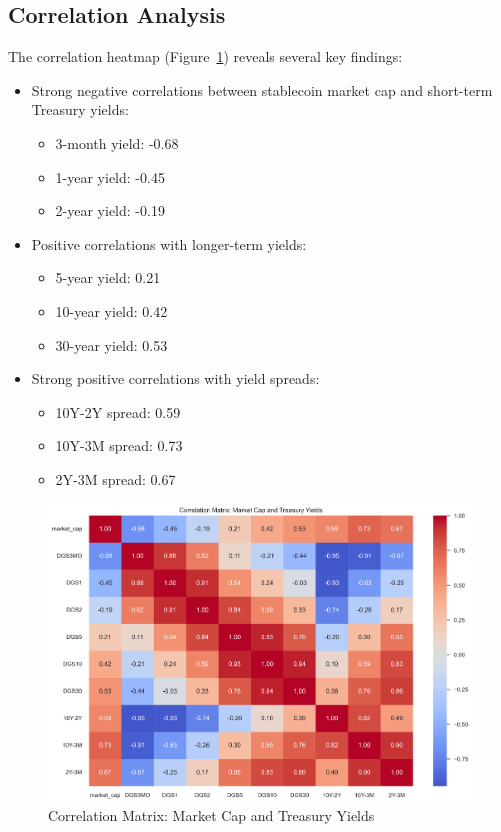 \documentclass[12pt,a4paper]{article}
\begin{document}
\subsection{Correlation Analysis}
The correlation heatmap (Figure~\ref{fig:correlation_heatmap}) reveals several key findings:
\begin{itemize}
    \item Strong negative correlations between stablecoin market cap and short-term Treasury yields:
    \begin{itemize}
        \item 3-month yield: -0.68
        \item 1-year yield: -0.45
        \item 2-year yield: -0.19
    \end{itemize}
    \item Positive correlations with longer-term yields:
    \begin{itemize}
        \item 5-year yield: 0.21
        \item 10-year yield: 0.42
        \item 30-year yield: 0.53
    \end{itemize}
    \item Strong positive correlations with yield spreads:
    \begin{itemize}
        \item 10Y-2Y spread: 0.59
        \item 10Y-3M spread: 0.73
        \item 2Y-3M spread: 0.67
    \end{itemize}
\end{itemize}

\begin{figure}[H]
    \centering
    \includegraphics[width=\columnwidth]{figures/correlation_heatmap.png}
    \caption{Correlation Matrix: Market Cap and Treasury Yields}
    \label{fig:correlation_heatmap}
\end{figure}
\end{document}
